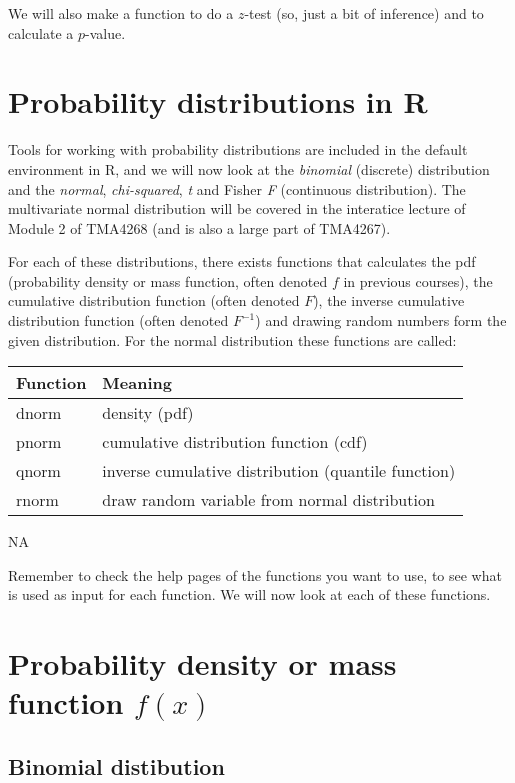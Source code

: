 \documentclass[]{article}
\begin{document}
We will also make a function to do a \(z\)-test (so, just a bit of
inference) and to calculate a \(p\)-value.

\section{Probability distributions in
R}\label{probability-distributions-in-r}

Tools for working with probability distributions are included in the
default environment in R, and we will now look at the \emph{binomial}
(discrete) distribution and the \emph{normal}, \emph{chi-squared},
\emph{t} and Fisher \emph{F} (continuous distribution). The multivariate
normal distribution will be covered in the interatice lecture of Module
2 of TMA4268 (and is also a large part of TMA4267).

For each of these distributions, there exists functions that calculates
the pdf (probability density or mass function, often denoted \(f\) in
previous courses), the cumulative distribution function (often denoted
\(F\)), the inverse cumulative distribution function (often denoted
\(F^{-1}\)) and drawing random numbers form the given distribution. For
the normal distribution these functions are called:

\begin{longtable}[]{@{}ll@{}}
\toprule
Function & Meaning\tabularnewline
\midrule
\endhead
dnorm & density (pdf)\tabularnewline
pnorm & cumulative distribution function (cdf)\tabularnewline
qnorm & inverse cumulative distribution (quantile
function)\tabularnewline
rnorm & draw random variable from normal distribution\tabularnewline
\bottomrule
\end{longtable}

NA

Remember to check the help pages of the functions you want to use, to
see what is used as input for each function. We will now look at each of
these functions.

\section{\texorpdfstring{Probability density or mass function
\(f(x)\)}{Probability density or mass function f(x)}}\label{probability-density-or-mass-function-fx}

\subsection{Binomial distibution}\label{binomial-distibution}
\end{document}
